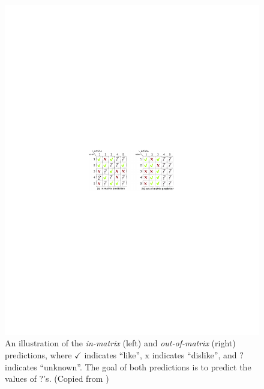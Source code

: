 \begin{figure}
  \centering
    \includegraphics[width=\textwidth]{fig/in_and_out_matrix}
      \caption{An illustration of the \emph{in-matrix} (left) and \emph{out-of-matrix} (right) predictions, where $\checkmark$ indicates ``like'', $\mathrm{x}$ indicates ``dislike'', and $?$ indicates ``unknown''. The goal of both predictions is to predict the values of ?'s. (Copied from \citet{wang2011collaborative})}
      \label{chpt:content:fig:in_and_out}
\end{figure}

